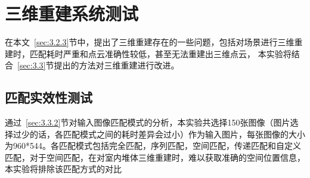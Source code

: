 \section{三维重建系统测试}
\label{sec:5.3}
在本文~\ref{sec:3.2.3}节中，提出了三维重建存在的一些问题，包括对场景进行三维重建时，匹配耗时严重和点云准确性较低，甚至无法重建出三维点云，
本实验将结合~\ref{sec:3.3}节提出的方法对三维重建进行改进。
\subsection{匹配实效性测试}
通过~\ref{sec:3.3.2}节对输入图像匹配模式的分析，本实验共选择150张图像（图片选择过少的话，各匹配模式之间的耗时差异会过小）作为输入图片，每张图像的大小为960*544。各匹配模式包括完全匹配，序列匹配，空间匹配，传递匹配和自定义匹配，对于空间匹配，在对室内堆体三维重建时，难以获取准确的空间位置信息，本实验将排除该匹配方式的对比

